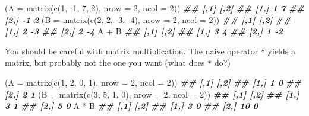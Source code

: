 \documentclass[
]{book}
\newenvironment{Shaded}{\begin{snugshade}}{\end{snugshade}}
\newcommand{\AttributeTok}[1]{\textcolor[rgb]{0.77,0.63,0.00}{#1}}
\newcommand{\DecValTok}[1]{\textcolor[rgb]{0.00,0.00,0.81}{#1}}
\newcommand{\DocumentationTok}[1]{\textcolor[rgb]{0.56,0.35,0.01}{\textbf{\textit{#1}}}}
\newcommand{\FunctionTok}[1]{\textcolor[rgb]{0.00,0.00,0.00}{#1}}
\newcommand{\NormalTok}[1]{#1}
\newcommand{\SpecialCharTok}[1]{\textcolor[rgb]{0.00,0.00,0.00}{#1}}
\theoremstyle{definition}
\theoremstyle{definition}
\theoremstyle{definition}
\theoremstyle{definition}
\theoremstyle{remark}
\begin{document}
\begin{Shaded}
\begin{Highlighting}[]
\NormalTok{(}\AttributeTok{A =} \FunctionTok{matrix}\NormalTok{(}\FunctionTok{c}\NormalTok{(}\DecValTok{1}\NormalTok{, }\SpecialCharTok{{-}}\DecValTok{1}\NormalTok{, }\DecValTok{7}\NormalTok{, }\DecValTok{2}\NormalTok{), }\AttributeTok{nrow =} \DecValTok{2}\NormalTok{, }\AttributeTok{ncol =} \DecValTok{2}\NormalTok{))}
\DocumentationTok{\#\#      [,1] [,2]}
\DocumentationTok{\#\# [1,]    1    7}
\DocumentationTok{\#\# [2,]   {-}1    2}
\NormalTok{(}\AttributeTok{B =} \FunctionTok{matrix}\NormalTok{(}\FunctionTok{c}\NormalTok{(}\DecValTok{2}\NormalTok{, }\DecValTok{2}\NormalTok{, }\SpecialCharTok{{-}}\DecValTok{3}\NormalTok{, }\SpecialCharTok{{-}}\DecValTok{4}\NormalTok{), }\AttributeTok{nrow =} \DecValTok{2}\NormalTok{, }\AttributeTok{ncol =} \DecValTok{2}\NormalTok{))}
\DocumentationTok{\#\#      [,1] [,2]}
\DocumentationTok{\#\# [1,]    2   {-}3}
\DocumentationTok{\#\# [2,]    2   {-}4}
\NormalTok{A }\SpecialCharTok{+}\NormalTok{ B}
\DocumentationTok{\#\#      [,1] [,2]}
\DocumentationTok{\#\# [1,]    3    4}
\DocumentationTok{\#\# [2,]    1   {-}2}
\end{Highlighting}
\end{Shaded}

You should be careful with matrix multiplication. The naive operator \texttt{*} yields a matrix, but probably not the one you want (what does \texttt{*} do?)

\begin{Shaded}
\begin{Highlighting}[]
\NormalTok{(}\AttributeTok{A =} \FunctionTok{matrix}\NormalTok{(}\FunctionTok{c}\NormalTok{(}\DecValTok{1}\NormalTok{, }\DecValTok{2}\NormalTok{, }\DecValTok{0}\NormalTok{, }\DecValTok{1}\NormalTok{), }\AttributeTok{nrow =} \DecValTok{2}\NormalTok{, }\AttributeTok{ncol =} \DecValTok{2}\NormalTok{))}
\DocumentationTok{\#\#      [,1] [,2]}
\DocumentationTok{\#\# [1,]    1    0}
\DocumentationTok{\#\# [2,]    2    1}
\NormalTok{(}\AttributeTok{B =} \FunctionTok{matrix}\NormalTok{(}\FunctionTok{c}\NormalTok{(}\DecValTok{3}\NormalTok{, }\DecValTok{5}\NormalTok{, }\DecValTok{1}\NormalTok{, }\DecValTok{0}\NormalTok{), }\AttributeTok{nrow =} \DecValTok{2}\NormalTok{, }\AttributeTok{ncol =} \DecValTok{2}\NormalTok{))}
\DocumentationTok{\#\#      [,1] [,2]}
\DocumentationTok{\#\# [1,]    3    1}
\DocumentationTok{\#\# [2,]    5    0}
\NormalTok{A }\SpecialCharTok{*}\NormalTok{ B}
\DocumentationTok{\#\#      [,1] [,2]}
\DocumentationTok{\#\# [1,]    3    0}
\DocumentationTok{\#\# [2,]   10    0}
\end{Highlighting}
\end{Shaded}
\end{document}
